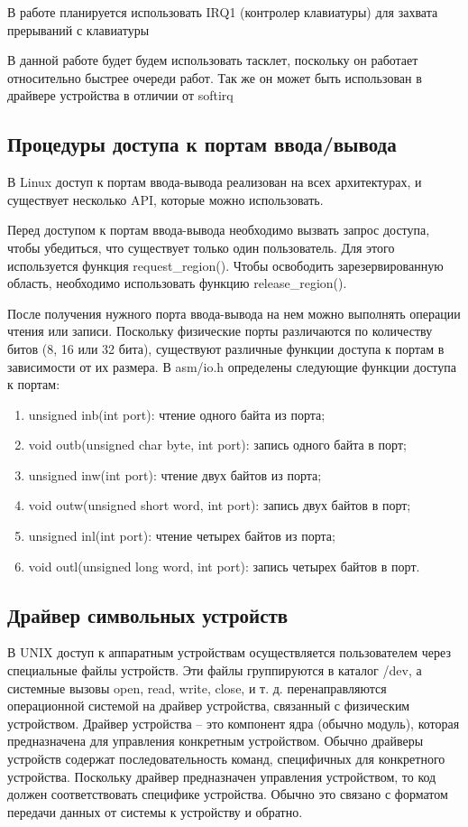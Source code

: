 В работе планируется использовать IRQ1 (контролер клавиатуры) для захвата прерываний с клавиатуры

В данной работе будет будем использовать тасклет, поскольку он работает относительно быстрее очереди работ. 
Так же он может быть использован в драйвере устройства в отличии от softirq

\subsection{Процедуры доступа к портам ввода/вывода}
В Linux доступ к портам ввода-вывода реализован на всех архитектурах, и существует несколько API, которые можно использовать.

Перед доступом к портам ввода-вывода необходимо вызвать запрос доступа, чтобы убедиться, что существует только один пользователь. 
Для этого используется функция request\_region(). 
Чтобы освободить зарезервированную область, необходимо использовать функцию release\_region().

После получения нужного порта ввода-вывода на нем можно выполнять операции чтения или записи. 
Поскольку физические порты различаются по количеству битов (8, 16 или 32 бита), существуют различные функции доступа к портам в зависимости от их размера. 
В asm/io.h определены следующие функции доступа к портам:
\begin{enumerate}
	\item unsigned inb(int port): чтение одного байта из порта;
	\item void outb(unsigned char byte, int port): запись одного байта в порт;
	\item unsigned inw(int port): чтение двух байтов из порта; 
	\item void outw(unsigned short word, int port): запись двух байтов в порт; 
	\item unsigned inl(int port): чтение четырех байтов из порта; 
	\item void outl(unsigned long word, int port): запись четырех байтов в порт. 
\end{enumerate}

\subsection{Драйвер символьных устройств}
В UNIX доступ к аппаратным устройствам осуществляется пользователем через специальные файлы устройств. 
Эти файлы группируются в каталог /dev, а системные вызовы open, read, write, close, и т. д. перенаправляются операционной системой на драйвер устройства, связанный с физическим устройством.
Драйвер устройства – это компонент ядра (обычно модуль), которая предназначена для управления конкретным устройством. 
Обычно драйверы устройств содержат последовательность команд, специфичных для конкретного устройства. 
Поскольку драйвер предназначен управления устройством, то код должен соответствовать специфике устройства. 
Обычно это связано с форматом передачи данных от системы к устройству и обратно.

